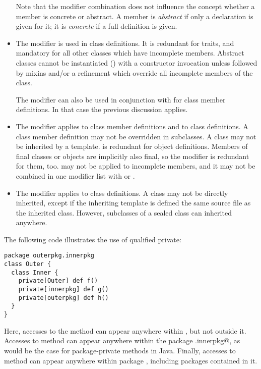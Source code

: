 \begin{itemize}
Note that the  modifier combination does not
influence the concept whether a member is concrete or abstract. A
member is {\em abstract} if only a declaration is given for it; it is
{\em concrete} if a full definition is given.
\item
The  modifier is used in class definitions. It is
redundant for traits, and mandatory for all other classes which have
incomplete members.  Abstract classes cannot be instantiated
() with a constructor invocation unless
followed by mixins and/or a refinement which override all
incomplete members of the class.

The  modifier can also be used in conjunction with
 for class member definitions. In that case the
previous discussion applies.
\item
The  modifier applies to class member definitions and to
class definitions. A  class member definition may not be
overridden in subclasses. A  class may not be inherited by
a template.  is redundant for object definitions.  Members
of final classes or objects are implicitly also final, so the
 modifier is redundant for them, too.   may
not be applied to incomplete members, and it may not be combined in one
modifier list with  or .
\item
The  modifier applies to class definitions. A
 class may not be directly inherited, except if the inheriting 
template is defined the same source file as the inherited class.
However, subclasses of a sealed class can inherited anywhere.
\end{itemize}

\example The following code illustrates the use of qualified private:
\begin{lstlisting}
package outerpkg.innerpkg
class Outer {
  class Inner {
    private[Outer] def f()
    private[innerpkg] def g()
    private[outerpkg] def h()
  }
}
\end{lstlisting}
Here, accesses to the method \lstinline@f@ can appear anywhere within
\lstinline@OuterClass@, but not outside it. Accesses to method
\lstinline@g@ can appear anywhere within the package
\lstinline@outerpkg.innerpkg@, as would be the case for
package-private methods in Java. Finally, accesses to method
\lstinline@h@ can appear anywhere within package \lstinline@outerpkg@,
including packages contained in it. 

